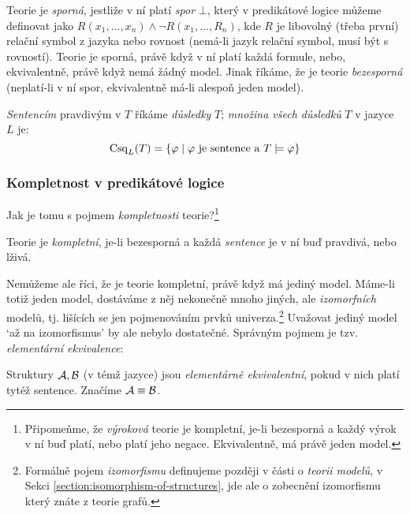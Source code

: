 Teorie je \emph{sporná}, jestliže v ní platí \emph{spor} $\bot$, který v predikátové logice můžeme definovat jako $R(x_1,\dots,x_n)\land \neg R(x_1,\dots,R_n)$, kde $R$ je libovolný (třeba první) relační symbol z jazyka nebo rovnost (nemá-li jazyk relační symbol, musí být s rovností). Teorie je sporná, právě když v ní platí každá formule, nebo, ekvivalentně, právě když nemá žádný model. Jinak říkáme, že je teorie \emph{bezesporná} (neplatí-li v ní spor, ekvivalentně má-li alespoň jeden model).

\emph{Sentencím} pravdivým v $T$ říkáme \emph{důsledky} $T$; \emph{množina všech důsledků} $T$ v jazyce $L$ je:
$$
\operatorname{Csq}_L(T)=\{\varphi\mid\text{$\varphi$ je sentence a }T\models \varphi\}
$$

\subsubsection{Kompletnost v predikátové logice }
Jak je tomu s pojmem \emph{kompletnosti} teorie?\footnote{Připomeňme, že \emph{výroková} teorie je kompletní, je-li bezesporná a každý výrok v ní buď platí, nebo platí jeho negace. Ekvivalentně, má právě 
jeden model.}

\begin{definition}
    Teorie je \emph{kompletní}, je-li bezesporná a každá \emph{sentence} je v ní buď pravdivá, nebo lživá.
\end{definition}

Nemůžeme ale říci, že je teorie kompletní, právě když má jediný model. Máme-li totiž jeden model, dostáváme z něj nekonečně mnoho jiných, ale \emph{izomorfních} modelů, tj. lišících se jen pojmenováním prvků univerza.\footnote{Formálně pojem \emph{izomorfismu} definujeme později v části o \emph{teorii modelů}, v Sekci \ref{section:isomorphism-of-structures}, jde ale o zobecnění izomorfismu který znáte z teorie grafů.} Uvažovat jediný model `až na izomorfismus' by ale nebylo dostatečné. Správným pojmem je tzv. \emph{elementární ekvivalence}:

\begin{definition}
    Struktury $\mathcal{A},\mathcal{B}$ (v témž jazyce) jsou \emph{elementárně ekvivalentní}, pokud v nich platí tytéž sentence. Značíme $\mathcal{A}\equiv\mathcal{B}$.
\end{definition}

